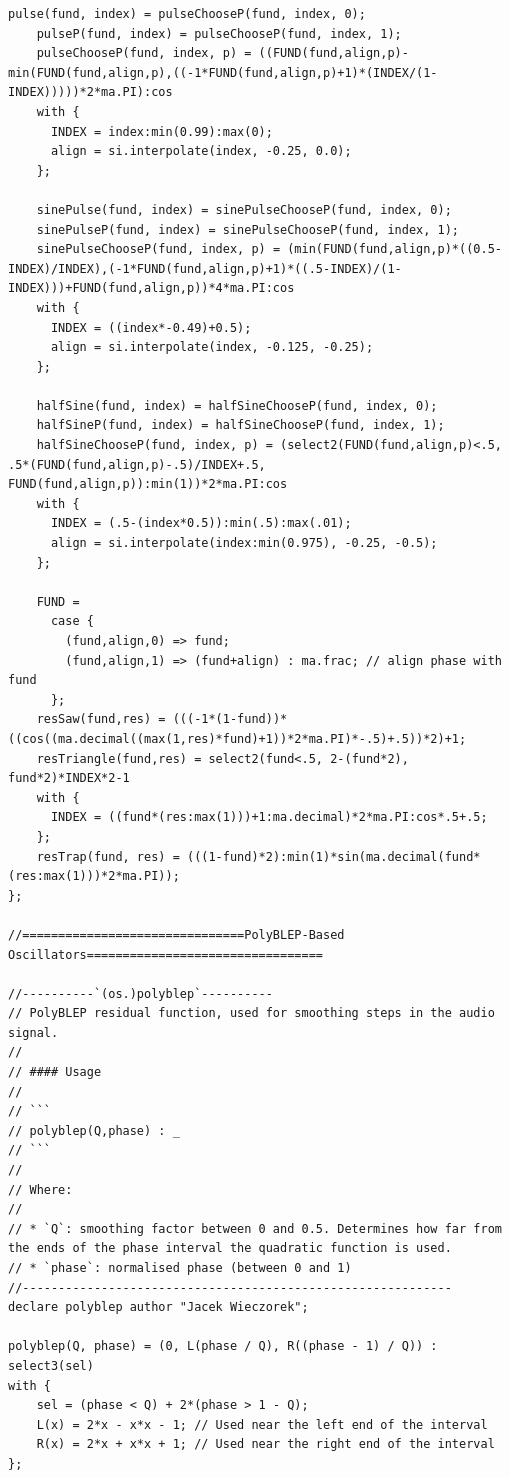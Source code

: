 \documentclass{article}
\begin{document}
\begin{lstlisting}[caption=\texttt{oscillators.lib}]
    pulse(fund, index) = pulseChooseP(fund, index, 0);
    pulseP(fund, index) = pulseChooseP(fund, index, 1);
    pulseChooseP(fund, index, p) = ((FUND(fund,align,p)-min(FUND(fund,align,p),((-1*FUND(fund,align,p)+1)*(INDEX/(1-INDEX)))))*2*ma.PI):cos
    with {
      INDEX = index:min(0.99):max(0);
      align = si.interpolate(index, -0.25, 0.0);
    };

    sinePulse(fund, index) = sinePulseChooseP(fund, index, 0);
    sinePulseP(fund, index) = sinePulseChooseP(fund, index, 1);
    sinePulseChooseP(fund, index, p) = (min(FUND(fund,align,p)*((0.5-INDEX)/INDEX),(-1*FUND(fund,align,p)+1)*((.5-INDEX)/(1-INDEX)))+FUND(fund,align,p))*4*ma.PI:cos
    with {
      INDEX = ((index*-0.49)+0.5);
      align = si.interpolate(index, -0.125, -0.25);
    };

    halfSine(fund, index) = halfSineChooseP(fund, index, 0);
    halfSineP(fund, index) = halfSineChooseP(fund, index, 1);
    halfSineChooseP(fund, index, p) = (select2(FUND(fund,align,p)<.5, .5*(FUND(fund,align,p)-.5)/INDEX+.5, FUND(fund,align,p)):min(1))*2*ma.PI:cos
    with {
      INDEX = (.5-(index*0.5)):min(.5):max(.01);
      align = si.interpolate(index:min(0.975), -0.25, -0.5);
    };

    FUND =
      case {
        (fund,align,0) => fund;
        (fund,align,1) => (fund+align) : ma.frac; // align phase with fund
      };
    resSaw(fund,res) = (((-1*(1-fund))*((cos((ma.decimal((max(1,res)*fund)+1))*2*ma.PI)*-.5)+.5))*2)+1;
    resTriangle(fund,res) = select2(fund<.5, 2-(fund*2), fund*2)*INDEX*2-1
    with {
      INDEX = ((fund*(res:max(1)))+1:ma.decimal)*2*ma.PI:cos*.5+.5;
    };
    resTrap(fund, res) = (((1-fund)*2):min(1)*sin(ma.decimal(fund*(res:max(1)))*2*ma.PI));
};

//===============================PolyBLEP-Based Oscillators=================================

//----------`(os.)polyblep`----------
// PolyBLEP residual function, used for smoothing steps in the audio signal.
//
// #### Usage
//
// ```
// polyblep(Q,phase) : _
// ```
//
// Where:
//
// * `Q`: smoothing factor between 0 and 0.5. Determines how far from the ends of the phase interval the quadratic function is used.
// * `phase`: normalised phase (between 0 and 1)
//------------------------------------------------------------
declare polyblep author "Jacek Wieczorek";

polyblep(Q, phase) = (0, L(phase / Q), R((phase - 1) / Q)) : select3(sel)
with {
    sel = (phase < Q) + 2*(phase > 1 - Q);
    L(x) = 2*x - x*x - 1; // Used near the left end of the interval
    R(x) = 2*x + x*x + 1; // Used near the right end of the interval
};


\end{lstlisting}
\end{document}
